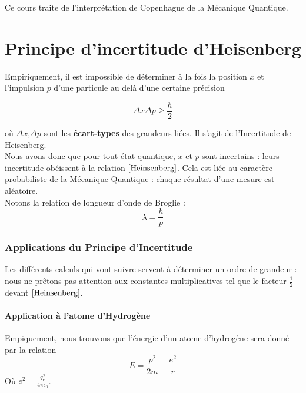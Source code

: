 \documentclass[../Notes de cours]{subfiles}
\begin{document}
\begin{remark} Ce cours traite de l'interprétation de Copenhague de la Mécanique Quantique. \end{remark}
\part{Principe d'incertitude d'Heisenberg}
Empiriquement, il est impossible de déterminer à la fois la position $x$ et l'impulsion $p$ d'une particule au delà d'une certaine précision

\begin{equation}
\label{Heinsenberg}
\Delta x \Delta p \geq \frac{\hbar}{2}
\end{equation}

où $\Delta x$,$\Delta p$ sont les \textbf{écart-types} des grandeurs liées. Il s'agit de l'Incertitude de Heisenberg.\\

Nous avons donc que pour tout état quantique, $x$ et $p$ sont incertains : leurs incertitude obéissent à la relation $\ref{Heinsenberg}$. Cela est liée au caractère probabiliste de la Mécanique Quantique : chaque résultat d'une mesure est aléatoire.\\

Notons la relation de longueur d'onde de Broglie : 
\begin{equation}
\label{Broglie}
\lambda = \frac{h}{p}
\end{equation}

\section{Applications du Principe d'Incertitude}
Les différents calculs qui vont suivre servent à déterminer un ordre de grandeur : nous ne prêtons pas attention aux constantes multiplicatives tel que le facteur $\frac{1}{2}$ devant $\ref{Heinsenberg}$.
\subsection{Application à l'atome d'Hydrogène}
Empiquement, nous trouvons que l'énergie d'un atome d'hydrogène sera donné par la relation
\begin{equation}
\label{Energie hydrogène}
E = \frac{p^2}{2m} - \frac{e^2}{r}
\end{equation}
Où $e^2 = \frac{q_e^2}{4 \pi \epsilon_0}$.\\
\end{document}
